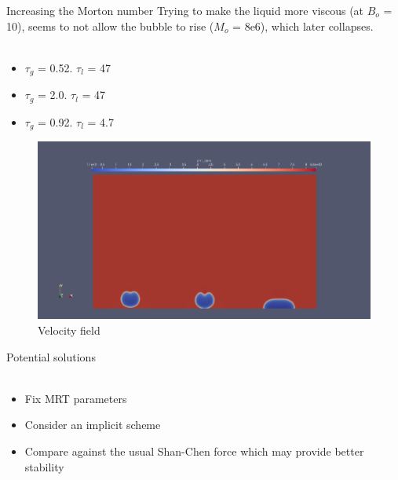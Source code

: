 \documentclass[8pt]{beamer}
\begin{document}
		
	\begin{frame}{Increasing the Morton number}
		Trying to make the liquid more viscous (at $B_o$ = 10), seems to not allow the bubble to rise ($M_o$ = 8e6), which later collapses.\\~\\
		\begin{itemize}
			\item $\tau_g$ = 0.52. $\tau_l$ = 47
			\item $\tau_g$ = 2.0. $\tau_l$ = 47 
			\item $\tau_g$ = 0.92. $\tau_l$ = 4.7 
		\end{itemize}
		\begin{figure}
			\centering
			\includegraphics[scale=0.15]{pics/risingCompDen456.png}
			\\{\tiny \justifying Velocity field}
		\end{figure}
	\end{frame}

	\begin{frame}{Potential solutions}
		\textbf{}\\~\\
		\begin{itemize}
			\item Fix MRT parameters
			\item Consider an implicit scheme
			\item Compare against the usual Shan-Chen force which may provide better stability 
		\end{itemize}
	\end{frame}
	
\end{document}

